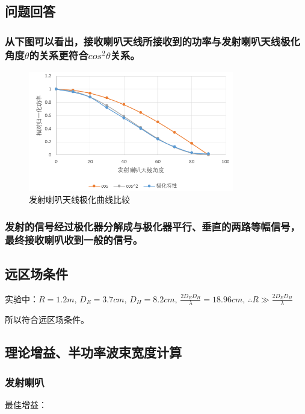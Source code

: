 \documentclass{../source/Experiment}
\begin{document}
        \subsection{问题回答}
            \subsubsection{从下图可以看出，接收喇叭天线所接收到的功率与发射喇叭天线极化角度$\theta$的关系更符合$cos^2 \theta$关系。}

            \begin{figure}[H]
                \centering
                \includegraphics[width = 0.8\textwidth]{pic/发射喇叭天线极化曲线比较.png}
                \caption{发射喇叭天线极化曲线比较}
            \end{figure}

            \subsubsection{发射的信号经过极化器分解成与极化器平行、垂直的两路等幅信号，最终接收喇叭收到一般的信号。
            }

        \subsection{远区场条件}

        实验中：$R = 1.2m, \, D_E = 3.7cm, \, D_H = 8.2cm, \, \frac{2 D_E D_H}{\lambda} = 18.96cm, \,  \therefore   R \gg  \frac{2 D_E D_H}{\lambda} $

        所以符合远区场条件。

        \subsection{理论增益、半功率波束宽度计算}
            \subsubsection{发射喇叭}
            最佳增益：
            
\end{document}

